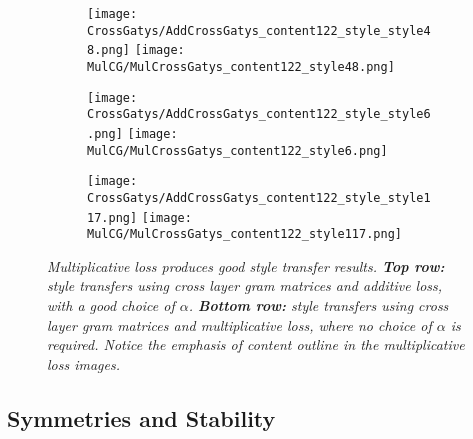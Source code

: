 \documentclass[runningheads]{llncs}
\begin{document}



\begin{figure}[!htbp]
\centering
\small 
\begin{subfigure}[t]{0.3\linewidth}
    \texttt{[image: CrossGatys/AddCrossGatys\_content122\_style\_style48.png]}
    \texttt{[image: MulCG/MulCrossGatys\_content122\_style48.png]}
\end{subfigure}
\begin{subfigure}[t]{0.3\linewidth}
    \texttt{[image: CrossGatys/AddCrossGatys\_content122\_style\_style6.png]}
    \texttt{[image: MulCG/MulCrossGatys\_content122\_style6.png]}
\end{subfigure}
\begin{subfigure}[t]{0.3\linewidth}
    \texttt{[image: CrossGatys/AddCrossGatys\_content122\_style\_style117.png]} 
    \texttt{[image: MulCG/MulCrossGatys\_content122\_style117.png]}
\end{subfigure}
\caption{\em 
 Multiplicative loss produces good style transfer results.
{\bf Top row:} style transfers using cross layer gram matrices and additive loss, with a good choice of $\alpha$. {\bf
  Bottom row:} style transfers using cross layer gram matrices and multiplicative loss, where no choice of $\alpha$ is required. Notice the emphasis of  content outline in the multiplicative loss images. 
}
  \label{fig:MulCG}
\end{figure}

\subsection{Symmetries and Stability}
\end{document}
